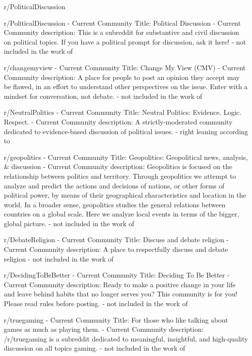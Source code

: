 
r/PoliticalDiscussion

r/PoliticalDiscussion
- Current Community Title: Political Discussion
- Current Community description: This is a subreddit for substantive and civil discussion on political topics. If you have a political prompt for discussion, ask it here!
- not included in the work of \cite{waller2021quantifying}

r/changemyview
- Current Community Title: Change My View (CMV)
- Current Community description: A place for people to post an opinion they accept may be flawed, in an effort to understand other perspectives on the issue. Enter with a mindset for conversation, not debate.
- not included in the work of \cite{waller2021quantifying}

r/NeutralPolitics
- Current Community Title: Neutral Politics: Evidence. Logic. Respect.
- Current Community description: A strictly-moderated community dedicated to evidence-based discussion of political issues.
- right leaning according to \cite{waller2021quantifying}

r/geopolitics
- Current Community Title: Geopolitics: Geopolitical news, analysis, \& discussion
- Current Community description: Geopolitics is focused on the relationship between politics and territory. Through geopolitics we attempt to analyze and predict the actions and decisions of nations, or other forms of political power, by means of their geographical characteristics and location in the world. In a broader sense, geopolitics studies the general relations between countries on a global scale. Here we analyze local events in terms of the bigger, global picture. 
- not included in the work of \cite{waller2021quantifying}

r/DebateReligion
- Current Community Title: Discuss and debate religion
- Current Community description: A place to respectfully discuss and debate religion
- not included in the work of \cite{waller2021quantifying}


r/DecidingToBeBetter
- Current Community Title: Deciding To Be Better
- Current Community description: Ready to make a positive change in your life and leave behind habits that no longer serves you? This community is for you! Please read rules before posting. 
- not included in the work of \cite{waller2021quantifying}

r/truegaming
- Current Community Title: For those who like talking about games as much as playing them.
- Current Community description: /r/truegaming is a subreddit dedicated to meaningful, insightful, and high-quality discussion on all topics gaming.
- not included in the work of \cite{waller2021quantifying}


